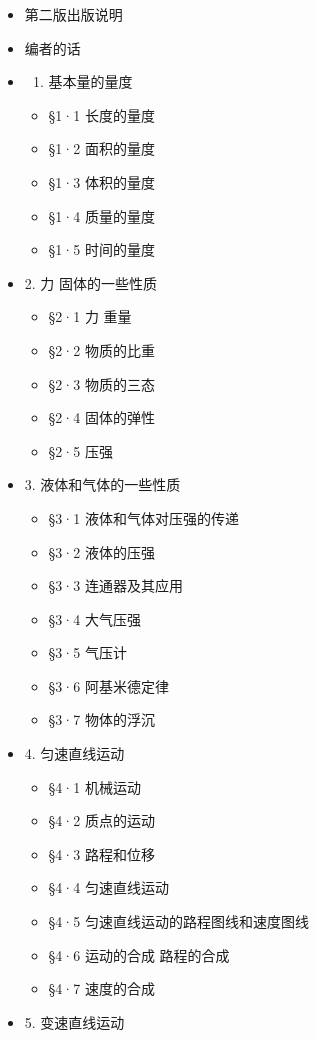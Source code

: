 \begin{itemize}
\item
  第二版出版说明
\item
  编者的话
\item
  \begin{enumerate}
  \def\labelenumi{\arabic{enumi}.}
  \tightlist
  \item
    基本量的量度
  \end{enumerate}

  \begin{itemize}
  \tightlist
  \item
    §1·1 长度的量度
  \item
    §1·2 面积的量度
  \item
    §1·3 体积的量度
  \item
    §1·4 质量的量度
  \item
    §1·5 时间的量度
  \end{itemize}
\item
  2. 力 固体的一些性质

  \begin{itemize}
  \tightlist
  \item
    §2·1 力 重量
  \item
    §2·2 物质的比重
  \item
    §2·3 物质的三态
  \item
    §2·4 固体的弹性
  \item
    §2·5 压强
  \end{itemize}
\item
  3. 液体和气体的一些性质

  \begin{itemize}
  \tightlist
  \item
    §3·1 液体和气体对压强的传递
  \item
    §3·2 液体的压强
  \item
    §3·3 连通器及其应用
  \item
    §3·4 大气压强
  \item
    §3·5 气压计
  \item
    §3·6 阿基米德定律
  \item
    §3·7 物体的浮沉
  \end{itemize}
\item
  4. 匀速直线运动

  \begin{itemize}
  \tightlist
  \item
    §4·1 机械运动
  \item
    §4·2 质点的运动
  \item
    §4·3 路程和位移
  \item
    §4·4 匀速直线运动
  \item
    §4·5 匀速直线运动的路程图线和速度图线
  \item
    §4·6 运动的合成 路程的合成
  \item
    §4·7 速度的合成
  \end{itemize}
\item
  5. 变速直线运动


\end{itemize}
